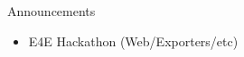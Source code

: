 \begin{frame}{Announcements}
    \begin{itemize}
        \item E4E Hackathon (Web/Exporters/etc)
    \end{itemize}
\end{frame}
